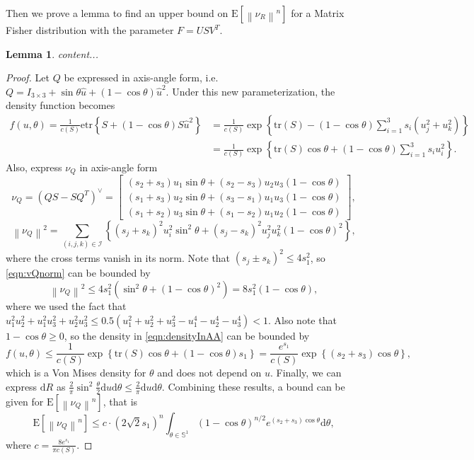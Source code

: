 \documentclass[10pt]{article}
\newtheorem{lemma}{Lemma}
\newcommand{\norm}[1]{\ensuremath{\left\| #1 \right\|}}
\newcommand{\tr}[1]{\ensuremath{\mathrm{tr}\left( #1 \right)}}
\newcommand{\etr}[1]{\ensuremath{\mathrm{etr}\left\{ #1 \right\}}}
\newcommand{\expect}[1]{\ensuremath{\mathrm{E}\left[ #1 \right]}}
\newcommand{\diff}[1]{\ensuremath{\mathrm{d} #1}}
\begin{document}
Then we prove a lemma to find an upper bound on $\expect{\norm{\nu_R}^n}$ for a Matrix Fisher distribution with the parameter $F=USV^T$.
\begin{lemma}
	content...
\end{lemma}
\begin{proof}
	Let $Q$ be expressed in axis-angle form, i.e. $Q = I_{3\times 3}+\sin\theta\hat{u} + (1-\cos\theta)\hat{u}^2$.
	Under this new parameterization, the density function becomes
	\begin{align} \label{eqn:densityInAA}
		f(u,\theta) = \frac{1}{c(S)}\etr{S+(1-\cos\theta)S\hat{u}^2} &= \frac{1}{c(S)}\exp\left\{\tr{S}-(1-\cos\theta)\sum_{i=1}^3s_i(u_j^2+u_k^2)\right\} \nonumber \\
		&= \frac{1}{c(S)}\exp\left\{\tr{S}\cos\theta+(1-\cos\theta)\sum_{i=1}^3s_iu_i^2\right\}.
	\end{align}
	Also, express $\nu_Q$ in axis-angle form
	\begin{equation}
		\nu_Q = (QS-SQ^T)^\vee = \begin{bmatrix}
			(s_2+s_3)u_1\sin\theta + (s_2-s_3)u_2u_3(1-\cos\theta) \\
			(s_1+s_3)u_2\sin\theta + (s_3-s_1)u_1u_3(1-\cos\theta) \\
			(s_1+s_2)u_3\sin\theta + (s_1-s_2)u_1u_2(1-\cos\theta)
		\end{bmatrix},
	\end{equation}
	\begin{equation} \label{eqn:vQnorm}
		\norm{\nu_Q}^2 = \sum_{(i,j,k)\in\mathcal{I}}\left\{ (s_j+s_k)^2u_i^2\sin^2\theta  +(s_j-s_k)^2u_j^2u_k^2(1-\cos\theta)^2\right\},
	\end{equation}
	where the cross terms vanish in its norm.
	Note that $(s_j \pm s_k)^2 \leq 4s_1^2$, so \eqref{eqn:vQnorm} can be bounded by
	\begin{equation}
		\norm{\nu_Q}^2 \leq 4s_1^2(\sin^2\theta+(1-\cos\theta)^2) = 8s_1^2(1-\cos\theta),
	\end{equation}
	where we used the fact that $u_1^2u_2^2+u_1^2u_3^2+u_2^2u_3^2 \leq 0.5(u_1^2+u_2^2+u_3^2-u_1^4-u_2^4-u_3^4) < 1$.
	Also note that $1-\cos\theta \geq 0$, so the density in \eqref{eqn:densityInAA} can be bounded by
	\begin{equation}
		f(u,\theta) \leq \frac{1}{c(S)}\exp\left\{\tr{S}\cos\theta+(1-\cos\theta)s_1\right\} = \frac{e^{s_1}}{c(S)}\exp\left\{(s_2+s_3)\cos\theta\right\},
	\end{equation}
	which is a Von Mises density for $\theta$ and does not depend on $u$.
	Finally, we can express $\diff{R}$ as $\frac{2}{\pi}\sin^2\frac{\theta}{2}\diff{u}\diff{\theta} \leq \frac{2}{\pi}\diff{u}\diff{\theta}$.
	Combining these results, a bound can be given for $\expect{\norm{\nu_Q}^n}$, that is
	\begin{equation}
		\expect{\norm{\nu_Q}^n} \leq c\cdot(2\sqrt{2}s_1)^n \int_{\theta\in\mathbb{S}^1}(1-\cos\theta)^{n/2}e^{(s_2+s_3)\cos\theta}\diff{\theta},
	\end{equation}
	where $c = \frac{8e^{s_1}}{\pi c(S)}$.
\end{proof}
\end{document}
